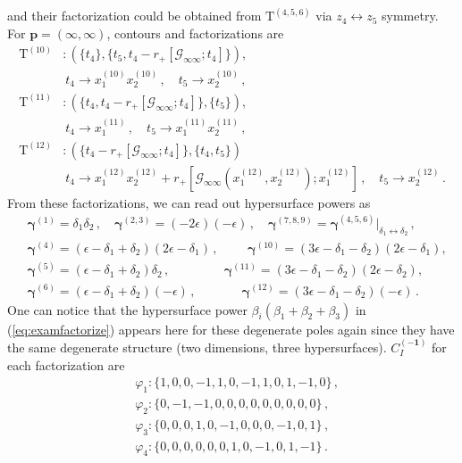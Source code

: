 \documentclass[a4paper,11pt]{article}
\newcommand{\nn}{\nonumber}
\newcommand{\nT}{\mathrm{T}}
\newcommand{\mG}{\mathcal{G}}
\newcommand{\ep}{\epsilon}
\def\eref#1{(\ref{#1})}
\begin{document}
and their factorization could be obtained from $\nT^{(4,5,6)}$ via  $z_4 \leftrightarrow z_5$ symmetry.
For $\bm{p}=(\infty,\infty)$, contours and factorizations are
 \begin{align}
\nT^{(10)} &: (\{t_4\} , \{t_5,t_4-r_+[\mG_{\infty\infty};t_4]\}),\nn\\
&~t_4 \to x_1^{(10)} x_2^{(10)} \,, \quad t_5\to x_2^{(10)} \,,
\\
\nT^{(11)} &: ( \{t_4,t_4-r_+[\mG_{\infty\infty};t_4]\},\{t_5\} ),\nn\\
&~t_4 \to  x_1^{(11)} \,, \quad t_5\to x_1^{(11)} x_2^{(11)} \,,
\\
\nT^{(12)} &: (\{t_4-r_+[\mG_{\infty\infty};t_4]\} , \{t_4,t_5\}) \nn\\
&~ t_4 \to x_1^{(12)} x_2^{(12)} + r_{+}[\mG_{\infty\infty}(x_1^{(12)},x_2^{(12)});x_1^{(12)}] \,, \quad t_5\to x_2^{(12)} \,.\label{eq:T101112reg}
\end{align}
From these factorizations, we can read out hypersurface powers as
\begin{align}
&\bm{\gamma}^{(1)}=\delta_1 \delta_2 \,, \quad \bm{\gamma}^{(2,3)}=(-2\ep)(-\ep) \,, \quad \bm{\gamma}^{(7,8,9)}= \bm{\gamma}^{(4,5,6)}\Big|_{\delta_1 \leftrightarrow \delta_2} \,,\nn\\
&\bm{\gamma}^{(4)}= \left(\ep-\delta _1+\delta _2\right)\left(2 \ep -\delta_1\right) \, , \quad 
 ~~~~~~\bm{\gamma}^{(10)}=\left(3\ep-\delta _1-\delta _2\right) \left(2 \ep -\delta_1\right),\nn\\
 &\bm{\gamma}^{(5)}= \left(\ep-\delta _1+\delta _2\right)\delta_2 \,, \quad ~~~~~~~~~~~~~~~\bm{\gamma}^{(11)}=\left(3\ep-\delta _1-\delta _2\right) \left(2 \ep -\delta_2\right),\nn\\
 &\bm{\gamma}^{(6)}=\left(\ep-\delta _1+\delta _2\right)(-\ep ) \,, \quad  
 ~~~~~~~~~~~~\bm{\gamma}^{(12)}=\left(3\ep-\delta _1-\delta _2\right)(-\ep) \,.~~~\label{5.18}
\end{align}
One can notice that the  hypersurface power $\beta_i(\beta_1+\beta_2+\beta_3)$ in  \eref{eq:examfactorize} appears here for these degenerate poles again  since they have the same degenerate structure (two dimensions, three hypersurfaces).
$C^{(\bm{-1})}_I$ for each factorization are
\begin{align}
&\varphi_{1}:\{1,0,0,-1,1,0,-1,1,0,1,-1,0\}\,,\nn\\
&\varphi_{2}:\{0,-1,-1,0,0,0,0,0,0,0,0,0\}\,,\nn\\
&\varphi_{3}:\{0,0,0,1,0,-1,0,0,0,-1,0,1\}\,,\nn\\
&\varphi_{4}:\{0,0,0,0,0,0,1,0,-1,0,1,-1\}\,.  \label{eq:commonpole2l}
\end{align}
\end{document}
